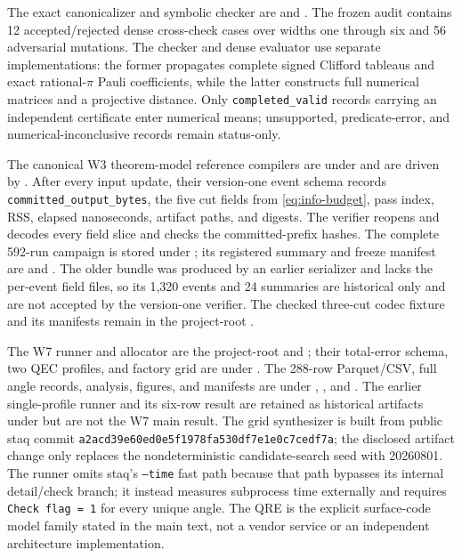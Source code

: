 The exact canonicalizer and symbolic checker are
 and
.  The frozen audit
 contains 12 accepted/rejected dense
cross-check cases over widths one through six and 56 adversarial mutations.
The checker and dense evaluator use separate implementations: the former
propagates complete signed Clifford tableaus and exact rational-$\pi$ Pauli
coefficients, while the latter constructs full numerical matrices and a
projective distance.  Only \texttt{completed\_valid} records carrying an
independent certificate enter numerical means; unsupported, predicate-error,
and numerical-inconclusive records remain status-only.

The canonical W3 theorem-model reference compilers are under
 and are driven by
.  After every input update, their
version-one event schema records \texttt{committed\_output\_bytes}, the five
cut fields from \eqref{eq:info-budget}, pass index, RSS, elapsed nanoseconds,
artifact paths, and digests.  The verifier reopens and decodes every field
slice and checks the committed-prefix hashes.  The complete 592-run campaign
is stored under ; its registered
summary and freeze manifest are  and
.  The older
 bundle was produced by an earlier serializer and
lacks the per-event field files, so its 1,320 events and 24 summaries are
historical only and are not accepted by the version-one verifier.  The checked
three-cut codec fixture and its manifests remain in the project-root
.

The W7 runner and allocator are the project-root
 and
; their total-error schema, two QEC
profiles, and factory grid are under .  The 288-row Parquet/CSV,
full angle records, analysis, figures, and manifests are under
, , and
.  The earlier single-profile runner and its six-row result are
retained as historical artifacts under  but
are not the W7 main result.  The grid synthesizer is built from
public staq commit
\texttt{a2acd39e60ed0e5f1978fa530df7e1e0c7cedf7a}; the disclosed artifact change
only replaces the nondeterministic candidate-search seed with 20260801.  The
runner omits staq's \texttt{--time} fast path because that path bypasses its
internal detail/check branch; it instead measures subprocess time externally
and requires \texttt{Check flag = 1} for every unique angle.  The QRE is the
explicit surface-code model family stated in the main text, not a vendor
service or an independent architecture implementation.

